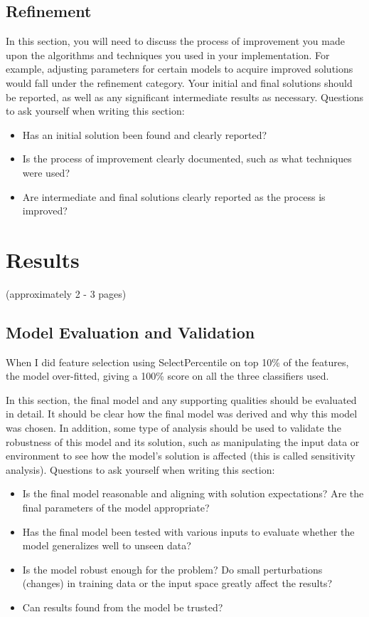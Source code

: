 \section*{Refinement}
In this section, you will need to discuss the process of improvement you made upon the algorithms and techniques you used in your implementation. For example, adjusting parameters for certain models to acquire improved solutions would fall under the refinement category. Your initial and final solutions should be reported, as well as any significant intermediate results as necessary. Questions to ask yourself when writing this section:
\begin{itemize}%
\item Has an initial solution been found and clearly reported?
\item Is the process of improvement clearly documented, such as what techniques were used?
\item Are intermediate and final solutions clearly reported as the process is improved?
\end{itemize}

\chapter*{Results}
(approximately 2 - 3 pages)


\section*{Model Evaluation and Validation}

When I did feature selection using SelectPercentile on top 10\% of the features, the model over-fitted, giving a 100\% score on all the three classifiers used.


In this section, the final model and any supporting qualities should be evaluated in detail. It should be clear how the final model was derived and why this model was chosen. In addition, some type of analysis should be used to validate the robustness of this model and its solution, such as manipulating the input data or environment to see how the model’s solution is affected (this is called sensitivity analysis). Questions to ask yourself when writing this section:
\begin{itemize}%
\item Is the final model reasonable and aligning with solution expectations? Are the final parameters of the model appropriate?
\item Has the final model been tested with various inputs to evaluate whether the model generalizes well to unseen data?
\item Is the model robust enough for the problem? Do small perturbations (changes) in training data or the input space greatly affect the results?
\item Can results found from the model be trusted?
\end{itemize}

